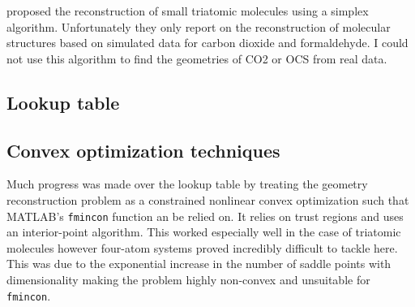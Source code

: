 \citet{Brichta09} proposed the reconstruction of small triatomic molecules using a simplex algorithm. Unfortunately they only report on the reconstruction of molecular structures based on simulated data for carbon dioxide and formaldehyde. I could not use this algorithm to find the geometries of CO2 or OCS from real data.

\subsection{Lookup table}

\subsection{Convex optimization techniques}
Much progress was made over the lookup table by treating the geometry reconstruction problem as a constrained nonlinear convex optimization such that MATLAB's \texttt{fmincon} function an be relied on. It relies on trust regions and uses an interior-point algorithm. This worked especially well in the case of triatomic molecules however four-atom systems proved incredibly difficult to tackle here. This was due to the exponential increase in the number of saddle points with dimensionality  making the problem highly non-convex and unsuitable for \texttt{fmincon}.
